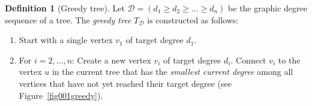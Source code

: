 \documentclass[12pt, a4paper]{article}
\theoremstyle{plain}  %
\theoremstyle{definition}  %
\newtheorem{definition}{Definition}
\begin{document}
\begin{definition}[Greedy tree]
Let $\mathscr{D} = (d_1 \geqslant d_2 \geqslant \dots \geqslant d_n)$ be the graphic degree sequence of a tree. The \emph{greedy tree} $T_\mathscr{D}$ is constructed as follows:

\begin{enumerate}
  \item Start with a single vertex $v_1$ of target degree $d_1$.
  \item For $i=2,\dots,n$: Create a new vertex $v_i$ of target degree $d_i$. Connect $v_i$ to the vertex $u$ in the current tree that has the \emph{smallest current degree} among all vertices that have not yet reached their target degree (see Figure~\ref{fig001greedy}).
\end{enumerate}
\end{definition}
\end{document}
